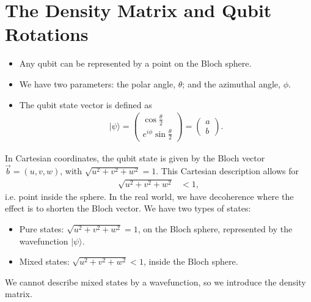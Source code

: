 \documentclass[a4paper, 11pt, normalem]{report}
\begin{document}
\chapter{The Density Matrix and Qubit Rotations}
\begin{itemize}
    \item Any qubit can be represented by a point on the Bloch sphere.
    \item We have two parameters: the polar angle, $\theta$; and the azimuthal angle, $\phi$.
    \item The qubit state vector is defined as
        \begin{align}
            |\psi\rangle = \begin{pmatrix} \cos\frac{\theta}{2}\\ e^{i\phi}\sin\frac{\theta}{2}\end{pmatrix} = \begin{pmatrix} a \\ b\end{pmatrix}.
        \end{align}
\end{itemize}
In Cartesian coordinates, the qubit state is given by the Bloch vector $\vec{b}=(u,v,w)$, with $\sqrt{u^2+v^2+w^2}=1$.
This Cartesian description allows for
    \begin{align}
        \sqrt{u^2+v^2+w^2} &< 1,
    \end{align}
i.e. point inside the sphere.
In the real world, we have decoherence where the effect is to shorten the Bloch vector.
We have two types of states:
\begin{itemize}
    \item Pure states: $\sqrt{u^2+v^2+w^2}=1$, on the Bloch sphere, represented by the wavefunction $|\psi\rangle$.
    \item Mixed states: $\sqrt{u^2+v^2+w^2} < 1$, inside the Bloch sphere.
\end{itemize}
We cannot describe mixed states by a wavefunction, so we introduce the density matrix.
\end{document}

